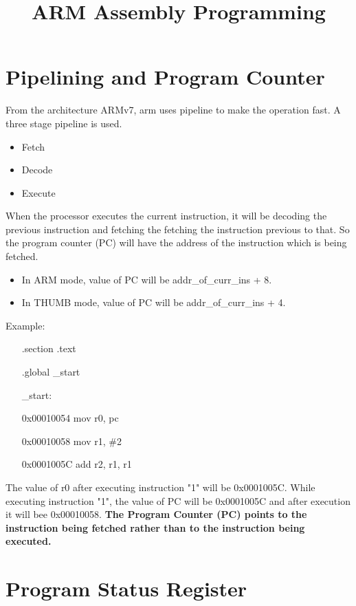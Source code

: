 \documentclass{article}
\begin{document}
	\title{ARM Assembly Programming}
	\maketitle
	\newpage
	\section{Pipelining and Program Counter}
	From the architecture ARMv7, arm uses pipeline to make the operation fast. A three stage pipeline is used.\newline
	\begin{itemize}
		\item Fetch
		\item Decode
		\item Execute
	\end{itemize}
	When the processor executes the current instruction, it will be decoding the previous instruction and fetching the fetching the instruction previous to that. So the program counter (PC) will have the address of the instruction which is being fetched.\newline
	\begin{itemize}
		\item In ARM mode, value of PC will be addr\_of\_curr\_ins + 8.
		\item In THUMB mode, value of PC will be addr\_of\_curr\_ins + 4.
	\end{itemize}
	Example:\newline
	\begin{itemize}
		\item[] .section .text
		\item[] .global \_start
		\item[] \_start:
		\item[0x00010054] \qquad mov r0, pc
		\item[0x00010058] \qquad mov r1, \#2
		\item[0x0001005C] \qquad add r2, r1, r1
	\end{itemize}
	The value of r0 after executing instruction "1" will be 0x0001005C. While executing instruction "1", the value of PC will be 0x0001005C and after execution it will bee 0x00010058.\newline
	\textbf{The Program Counter (PC) points to the instruction being fetched rather than to the instruction being executed.}
	\newpage
	\section{Program Status Register}
\end{document}
